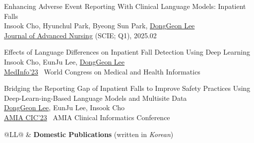 \documentclass[11pt,a4paper]{article}
\newlength{\leftcolumn}
\newlength{\rightcolumn}
\newlength{\midrightcolumn}
\newcounter{pubnum}
\newenvironment{publications}
{\begin{list}{}
    {\setlength{\leftmargin}{1.35in}
     \setlength{\itemsep}{0.5em}
     \setlength{\labelsep}{0em}
     \renewcommand{\makelabel}[1]{##1}}}
{\end{list}}
\newcommand{\pubitem}[1]{%
    \addtocounter{pubnum}{-1}%
    \item[\textup{[\arabic{pubnum}]}] #1%
}
\begin{document}
\begin{publications}
\pubitem{
    Enhancing Adverse Event Reporting With Clinical Language Models: Inpatient Falls\\
        Insook Cho, Hyunchul Park, Byeong Sun Park, \underline{DongGeon Lee} \\[3pt]
        \href{https://doi.org/10.1111/jan.16812}{Journal of Advanced Nursing} (SCIE; Q1), 2025.02
}

\pubitem{
    Effects of Language Differences on Inpatient Fall Detection Using Deep Learning \\
        Insook Cho, EunJu Lee, \underline{DongGeon Lee}\\[3pt]
        \href{https://pubmed.ncbi.nlm.nih.gov/38426881/}{MedInfo'23} \textbar\ World Congress on Medical and Health Informatics
}

\pubitem{
    Bridging the Reporting Gap of Inpatient Falls to Improve Safety Practices Using Deep-Learn-ing-Based Language Models and Multisite Data \\
        \underline{DongGeon Lee}, EunJu Lee, Insook Cho\\[3pt]
        \href{https://s4.goeshow.com/amia/cic/2023/schedule_at_a_glance.cfm?session_key=00DF797E-CE00-F26D-04E7-70E1ABCC96E1\&session_date=Thursday,\%20May\%2025,\%202023}{AMIA CIC'23} \textbar\ AMIA Clinical Informatics Conference
}

\end{publications}
\vspace{0.5em}

\begin{tabular}{@{}L{\leftcolumn}L{\midrightcolumn}@{}}
\textcolor{sectioncolor}{} & \textbf{Domestic Publications} (written in \textit{Korean})
\end{tabular}
\vspace{-0.5em}
\end{document}
